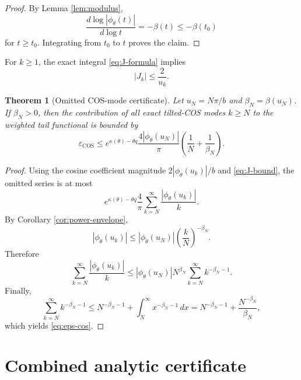 \documentclass[11pt]{article}
\newtheorem{theorem}{Theorem}[section]
\theoremstyle{definition}
\newcommand{\eps}{\varepsilon}
\begin{document}
\begin{proof}
By Lemma \ref{lem:modulus},
\[
\frac{d\log|\phi_{\theta}(t)|}{d\log t}=-\beta(t)\le-\beta(t_0)
\]
for $t\ge t_0$. Integrating from $t_0$ to $t$ proves the claim.
\end{proof}

For $k\ge1$, the exact integral \eqref{eq:J-formula} implies
\begin{equation}
|J_k|
\le \frac{2}{u_k}.
\label{eq:J-bound}
\end{equation}

\begin{theorem}[Omitted COS-mode certificate]
\label{thm:cos-tail}
Let $u_N=N\pi/b$ and $\beta_N=\beta(u_N)$. If $\beta_N>0$, then the contribution of all exact tilted-COS modes $k\ge N$ to the weighted tail functional is bounded by
\begin{equation}
\eps_{\mathrm{COS}}
\le
 e^{\kappa(\theta)-\theta q}
\frac{4|\phi_{\theta}(u_N)|}{\pi}
\left(\frac1N+\frac1{\beta_N}\right).
\label{eq:eps-cos}
\end{equation}
\end{theorem}

\begin{proof}
Using the cosine coefficient magnitude $2|\phi_{\theta}(u_k)|/b$ and \eqref{eq:J-bound}, the omitted series is at most
\[
e^{\kappa(\theta)-\theta q}
\frac{4}{\pi}
\sum_{k=N}^{\infty}\frac{|\phi_{\theta}(u_k)|}{k}.
\]
By Corollary \ref{cor:power-envelope},
\[
|\phi_{\theta}(u_k)|
\le
|\phi_{\theta}(u_N)|\left(\frac{k}{N}\right)^{-\beta_N}.
\]
Therefore
\[
\sum_{k=N}^{\infty}\frac{|\phi_{\theta}(u_k)|}{k}
\le
|\phi_{\theta}(u_N)|N^{\beta_N}
\sum_{k=N}^{\infty}k^{-\beta_N-1}.
\]
Finally,
\[
\sum_{k=N}^{\infty}k^{-\beta_N-1}
\le N^{-\beta_N-1}+\int_N^{\infty}x^{-\beta_N-1}\,dx
=N^{-\beta_N-1}+\frac{N^{-\beta_N}}{\beta_N},
\]
which yields \eqref{eq:eps-cos}.
\end{proof}

\section{Combined analytic certificate}
\end{document}
